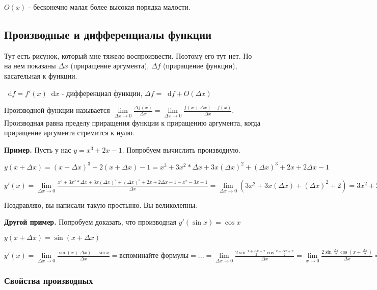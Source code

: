 \documentclass{article}
\newcommand*\diff{\mathop{}\!\mathrm{d}}
\begin{document}
\begin{flushleft}
\hfill

$O(x)$ - бесконечно малая более высокая порядка малости.

\subsection{Производные и дифференциалы функции}

Тут есть рисунок, который мне тяжело воспроизвести. Поэтому его тут нет. Но на нем показаны $\Delta x$ (приращение аргумента), $\Delta f$ (приращение функции), касательная к функции.

$\diff f = f' (x) \diff x$ - дифференциал функции, $\Delta f = \diff f + O(\Delta x)$

\hfill

Производной функции называется $\lim\limits_{\Delta x \to 0} \frac{\Delta f(x)}{\Delta x} = \lim\limits_{\Delta x \to 0} \frac{f(x + \Delta x) - f(x)}{\Delta x}$. Производная равна пределу приращения функции к приращению аргумента, когда приращение аргумента стремится к нулю.

\hfill

\textbf{Пример.} Пусть у нас $y = x^3 + 2x - 1$. Попробуем вычислить производную.

$y(x + \Delta x) = (x + \Delta x)^3 + 2(x + \Delta x) - 1 = x^3 + 3x^2 * \Delta x + 3x(\Delta x)^2 + (\Delta x)^3 + 2x + 2\Delta x - 1$

$y'(x) = \lim\limits_{\Delta x \to 0} \frac{x^3 + 3x^2 * \Delta x + 3x (\Delta x)^2 + (\Delta x)^3 + 2x + 2\Delta x - 1 - x^2 - 3x + 1}{\Delta x} = \lim\limits_{\Delta x \to 0} (3x^2 + 3x(\Delta x) + (\Delta x)^2 + 2) = 3x^2 + 2$

Поздравляю, вы написали такую простыню. Вы великолепны.

\hfill

\textbf{Другой пример.} Попробуем доказать, что производная $y'(\sin x) = \cos x$

$y(x + \Delta x) = \sin(x + \Delta x)$

$y'(x) = \lim\limits_{\Delta x \to 0} \frac{\sin(x + \Delta x) - \sin x}{\Delta x} = \text{вспоминайте формулы} = ... = \lim\limits_{\Delta x \to 0} \frac{2 \sin \frac{x + \Delta x - x}{2} \cos \frac{x + \Delta x + x}{2}}{\Delta x} = \lim\limits_{x \to 0} \frac{2 \sin \frac{\Delta x}{2} \cos (x + \frac{\Delta x}{2})}{\Delta x} = \lim\limits_{x \to 0} \frac{2 \cos x}{2} = \cos x$

\subsubsection{Свойства производных}


\end{flushleft}
\end{document}
